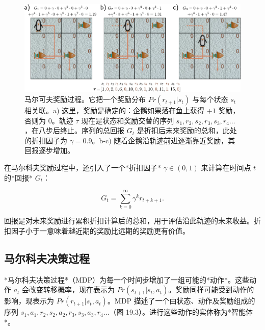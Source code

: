 \documentclass[lang=cn,newtx,10pt,scheme=chinese]{elegantbook}
\begin{document}
\begin{figure}[ht!]
\centering
\includegraphics[width=0.7\linewidth]{PDFFigures/UDLChap19PDF/ReinforceMDP2.pdf}
\caption{马尔可夫奖励过程。它把一个奖励分布 \(Pr(r_{t+1}|s_t)\) 与每个状态 \(s_t\) 相关联。a) 这里，奖励是确定的：企鹅如果落在鱼上获得 \(+1\) 奖励，否则为 \(0\)。轨迹 \(\tau\) 现在是状态和奖励交替的序列 \(s_1, r_2, s_2, r_3, s_3, r_4 \ldots\)，在八步后终止。序列的总回报 \(G_t\) 是折扣后未来奖励的总和，此处的折扣因子为 \(\gamma = 0.9\)。b-c) 随着企鹅沿轨迹前进逐渐靠近奖励，其回报逐步增加。}
\end{figure}

在马尔科夫奖励过程中，还引入了一个*折扣因子* \(\gamma \in (0, 1)\) 来计算在时间点 \(t\) 的*回报* \(G_t\)：

\begin{equation}
G_t = \sum_{k=0}^{\infty} \gamma^k r_{t+k+1}. 
\end{equation}

回报是对未来奖励进行累积折扣计算后的总和，用于评估沿此轨迹的未来收益。折扣因子小于一意味着越近期的奖励比远期的奖励更有价值。

\subsection{马尔科夫决策过程}

*马尔科夫决策过程*（MDP）为每一个时间步增加了一组可能的*动作*。这些动作 \(a_t\) 会改变转移概率，现在表示为 \(Pr(s_{t+1}|s_t, a_t)\)。奖励同样可能受到动作的影响，现表示为 \(Pr(r_{t+1}|s_t, a_t)\)。MDP 描述了一个由状态、动作及奖励组成的序列 \(s_1, a_1, r_2, s_2, a_2, r_3, s_3, a_3, r_4 \ldots\)（图 19.3）。进行这些动作的实体称为*智能体*。
\end{document}
